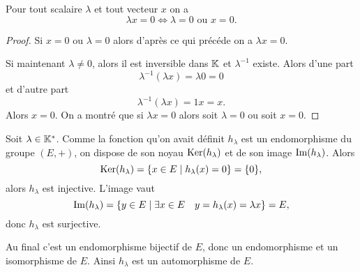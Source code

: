 \begin{prop}
  Pour tout scalaire \(\lambda\) et tout vecteur \(x\) on a
  \begin{equation}
    \lambda x = 0 \iff \lambda = 0 \text{~ou~} x=0.
  \end{equation}
\end{prop}
\begin{proof}
  Si \(x=0\) ou \(\lambda=0\) alors d'après ce qui précéde on a \(\lambda x=0\).

  Si maintenant \(\lambda \neq 0\), alors il est inversible dans \(\mathbb{K}\) et \(\lambda^{-1}\) existe. Alors d'une part
  \begin{equation}
    \lambda^{-1}(\lambda x)=\lambda 0 =0
  \end{equation}
  et d'autre part
  \begin{equation}
    \lambda^{-1}(\lambda x)=1 x=x.
  \end{equation}
  Alors \(x=0\). On a montré que si \(\lambda x=0\) alors soit \(\lambda=0\) ou soit \(x=0\).
\end{proof}

Soit \(\lambda \in \mathbb{K}^*\). Comme la fonction qu'on avait définit \(h_\lambda\) est un endomorphisme du groupe \((E,+)\), on dispose de son noyau \(\operatorname{Ker}(h_\lambda)\) et de son image \(\operatorname{Im}(h_\lambda)\). Alors
\begin{equation}
  \operatorname{Ker}(h_\lambda)=\left\{x \in E\mathrel{}\middle|\mathrel{}h_\lambda(x)=0\right\}=\{0\},
\end{equation}
alors \(h_\lambda\) est injective. L'image vaut
\begin{equation}
  \operatorname{Im}(h_\lambda)=\left\{y \in E\mathrel{}\middle|\mathrel{}\exists x \in E \quad y=h_\lambda(x)=\lambda x\right\} = E,
\end{equation}
donc \(h_\lambda\) est surjective.

Au final c'est un endomorphisme bijectif de \(E\), donc un endomorphisme et un isomorphisme de \(E\). Ainsi \(h_\lambda\) est un automorphisme de \(E\).

